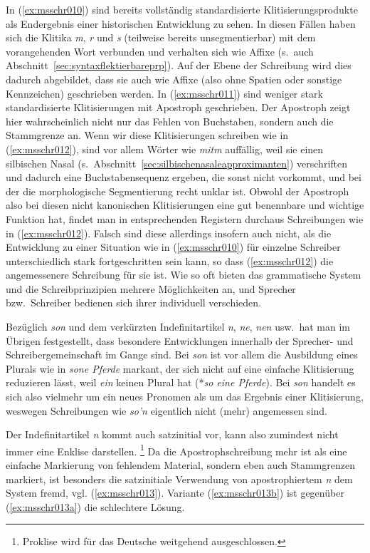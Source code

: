 In (\ref{ex:msschr010}) sind bereits vollständig standardisierte Klitisierungsprodukte als Endergebnis einer historischen Entwicklung zu sehen.
In diesen Fällen haben sich die Klitika \textit{m}, \textit{r} und \textit{s} (teilweise bereits unsegmentierbar) mit dem vorangehenden Wort verbunden und verhalten sich wie Affixe (s.\ auch Abschnitt~\ref{sec:syntaxflektierbareprp}).
Auf der Ebene der Schreibung wird dies dadurch abgebildet, dass sie auch wie Affixe (also ohne Spatien oder sonstige Kennzeichen) geschrieben werden.
In (\ref{ex:msschr011}) sind weniger stark standardisierte Klitisierungen mit Apostroph geschrieben.
Der Apostroph zeigt hier wahrscheinlich nicht nur das Fehlen von Buchstaben, sondern auch die Stammgrenze an.
Wenn wir diese Klitisierungen schreiben wie in (\ref{ex:msschr012}), sind vor allem Wörter wie \textit{mitm} auffällig, weil sie einen silbischen Nasal (s.\ Abschnitt~\ref{sec:silbischenasaleapproximanten}) verschriften und dadurch eine Buchstabensequenz ergeben, die sonst nicht vorkommt, und bei der die morphologische Segmentierung recht unklar ist.
Obwohl der Apostroph also bei diesen nicht kanonischen Klitisierungen eine gut benennbare und wichtige Funktion hat, findet man in entsprechenden Registern durchaus Schreibungen wie in (\ref{ex:msschr012}).
Falsch sind diese allerdings insofern auch nicht, als die Entwicklung zu einer Situation wie in (\ref{ex:msschr010}) für einzelne Schreiber unterschiedlich stark fortgeschritten sein kann, so dass (\ref{ex:msschr012}) die angemessenere Schreibung für sie ist.
Wie so oft bieten das grammatische System und die Schreibprinzipien mehrere Möglichkeiten an, und Sprecher bzw.\ Schreiber bedienen sich ihrer individuell verschieden.

Bezüglich \textit{son} und dem verkürzten Indefinitartikel \textit{n}, \textit{ne}, \textit{nen} usw.\ hat man im Übrigen festgestellt, dass besondere Entwicklungen innerhalb der Sprecher- und Schreibergemeinschaft im Gange sind.
Bei \textit{son} ist vor allem die Ausbildung eines Plurals wie in \textit{sone Pferde} markant, der sich nicht auf eine einfache Klitisierung reduzieren lässt, weil \textit{ein} keinen Plural hat (*\textit{so eine Pferde}).
Bei \textit{son} handelt es sich also vielmehr um ein neues Pronomen als um das Ergebnis einer Klitisierung, weswegen Schreibungen wie \textit{so'n} eigentlich nicht (mehr) angemessen sind.

Der Indefinitartikel \textit{n} kommt \zB auch satzinitial vor, kann also zumindest nicht immer eine Enklise darstellen.\label{abs:nen}%
\footnote{Proklise wird für das Deutsche weitgehend ausgeschlossen.}
Da die Apo\-stroph\-schrei\-bung mehr ist als eine einfache Markierung von fehlendem Material, sondern eben auch Stammgrenzen markiert, ist besonders die satzinitiale Verwendung von apostrophiertem \textit{n} dem System fremd, vgl. (\ref{ex:msschr013}).
Variante (\ref{ex:msschr013b}) ist gegenüber (\ref{ex:msschr013a}) die schlechtere Lösung.

